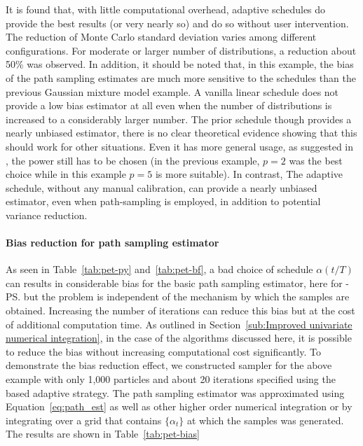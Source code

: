 It is found that, with little computational overhead, adaptive schedules do provide the best results (or very nearly so) and do so without user intervention. The reduction of Monte Carlo standard deviation varies among different configurations. For moderate or larger number of distributions, a reduction about 50\% was observed. In addition, it should be noted that, in this example, the bias of the path sampling estimates are much more sensitive to the schedules than the previous Gaussian mixture model example. A vanilla linear schedule does not provide a low bias estimator at all even when the number of distributions is increased to a considerably larger number. The prior schedule though provides a nearly unbiased estimator, there is no clear theoretical evidence showing that this should work for other situations. Even it has more general usage, as suggested in \cite{Calderhead:2009bd}, the power still has to be chosen (in the previous \gmm example, $p = 2$ was the best choice while in this \pet example $p = 5$ is more suitable). In contrast, The adaptive schedule, without any manual calibration, can provide a nearly unbiased estimator, even when path-sampling is employed, in addition to potential variance reduction.

\paragraph{Bias reduction for path sampling estimator}

As seen in Table~\ref{tab:pet-py} and~\ref{tab:pet-bf}, a bad choice of schedule $\alpha(t/T)$ can results in considerable bias for the basic path sampling estimator, here for \smc[2]-\ps but the problem is independent of the mechanism by which the samples are obtained. Increasing the number of iterations can reduce this bias but at the cost of additional computation time. As outlined in Section~\ref{sub:Improved univariate numerical integration}, in the case of the \smc algorithms discussed here, it is possible to reduce the bias without increasing computational cost significantly. To demonstrate the bias reduction effect, we constructed \smc sampler for the above \pet example with only 1,000 particles and about 20 iterations specified using the \cess based adaptive strategy. The path sampling estimator was approximated using Equation~\eqref{eq:path_est} as well as other higher order numerical integration or by integrating over a grid that contains $\{\alpha_t\}$ at which the samples was generated. The results are shown in Table~\ref{tab:pet-bias}

